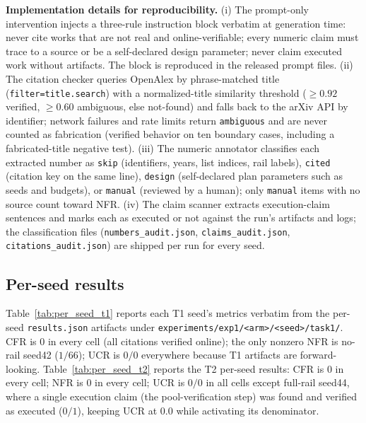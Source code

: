\documentclass[10pt,twocolumn]{article}
\begin{document}
\textbf{Implementation details for reproducibility.} (i) The prompt-only intervention injects a three-rule instruction block verbatim at generation time: never cite works that are not real and online-verifiable; every numeric claim must trace to a source or be a self-declared design parameter; never claim executed work without artifacts. The block is reproduced in the released prompt files. (ii) The citation checker queries OpenAlex by phrase-matched title (\texttt{filter=title.search}) with a normalized-title similarity threshold ($\geq 0.92$ verified, $\geq 0.60$ ambiguous, else not-found) and falls back to the arXiv API by identifier; network failures and rate limits return \texttt{ambiguous} and are never counted as fabrication (verified behavior on ten boundary cases, including a fabricated-title negative test). (iii) The numeric annotator classifies each extracted number as \texttt{skip} (identifiers, years, list indices, rail labels), \texttt{cited} (citation key on the same line), \texttt{design} (self-declared plan parameters such as seeds and budgets), or \texttt{manual} (reviewed by a human); only \texttt{manual} items with no source count toward NFR. (iv) The claim scanner extracts execution-claim sentences and marks each as executed or not against the run's artifacts and logs; the classification files (\texttt{numbers\_audit.json}, \texttt{claims\_audit.json}, \texttt{citations\_audit.json}) are shipped per run for every seed.

\subsection{Per-seed results}
Table~\ref{tab:per_seed_t1} reports each T1 seed's metrics verbatim from the per-seed \texttt{results.json} artifacts under \texttt{experiments/exp1/<arm>/<seed>/task1/}. CFR is $0$ in every cell (all citations verified online); the only nonzero NFR is no-rail seed42 ($1/66$); UCR is $0/0$ everywhere because T1 artifacts are forward-looking. Table~\ref{tab:per_seed_t2} reports the T2 per-seed results: CFR is $0$ in every cell; NFR is $0$ in every cell; UCR is $0/0$ in all cells except full-rail seed44, where a single execution claim (the pool-verification step) was found and verified as executed ($0/1$), keeping UCR at $0.0$ while activating its denominator.
\end{document}
